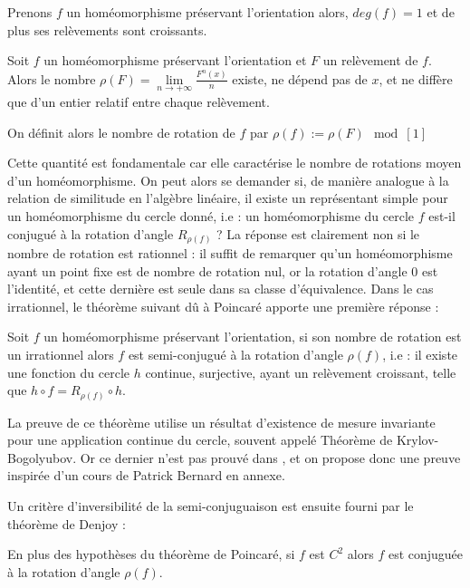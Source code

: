 \documentclass[11pt,a4paper]{article}
\begin{document}
\begin{prop}
Prenons $f$ un homéomorphisme préservant l'orientation alors, $deg(f)=1$ et de plus ses relèvements sont croissants.
\end{prop}

\begin{prop}
Soit $f$ un homéomorphisme préservant l'orientation et $F$ un relèvement de $f$. Alors le nombre $\rho (F)=\displaystyle \lim\limits_{n \to +\infty} \frac{F^n(x)}{n}$ existe, ne dépend pas de $x$, et ne diffère que d'un entier relatif entre chaque relèvement.
\end{prop}

\begin{defin}
On définit alors le nombre de rotation de $f$ par $\rho(f) := \rho (F) \mod[1]$
\end{defin}
Cette quantité est fondamentale car elle caractérise le nombre de rotations moyen d'un homéomorphisme. On peut alors se demander si, de manière analogue à la relation de similitude en l'algèbre linéaire, il existe un représentant simple pour un homéomorphisme du cercle donné, i.e : un homéomorphisme du cercle $f$ est-il conjugué à la rotation d'angle $R_{\rho(f)}$ ? La réponse est clairement non si le nombre de rotation est rationnel : il suffit de remarquer qu'un homéomorphisme ayant un point fixe est de nombre de rotation nul, or la rotation d'angle $0$ est l'identité, et cette dernière est seule dans sa classe d'équivalence. Dans le cas irrationnel, le théorème suivant dû à Poincaré apporte une première réponse :
\begin{thm}[Poincaré]\label{poincare}
Soit $f$ un homéomorphisme préservant l'orientation, si son nombre de rotation est un irrationnel alors $f$ est semi-conjugué à la rotation d'angle $\rho(f)$, i.e : il existe une fonction du cercle $h$ continue, surjective, ayant un relèvement croissant, telle que $h\circ f = R_{\rho(f)} \circ h$.
\end{thm}
\begin{rmq}
La preuve de ce théorème utilise un résultat d'existence de mesure invariante pour une application continue du cercle, souvent appelé Théorème de Krylov-Bogolyubov. Or ce dernier n'est pas prouvé dans \cite{dgv}, et on propose donc une preuve inspirée d'un cours de Patrick Bernard en annexe.
\end{rmq}

Un critère d'inversibilité de la semi-conjuguaison est ensuite fourni par le théorème de Denjoy :
\begin{thm}[Denjoy]\label{denjoy}
En plus des hypothèses du théorème de Poincaré, si $f$ est $C^2$ alors $f$ est conjuguée à la rotation d'angle $\rho(f)$.
\end{thm}
\end{document}
